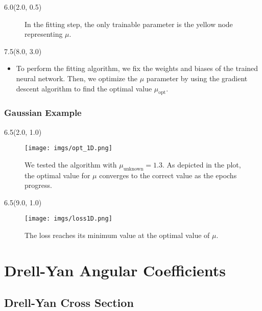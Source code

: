 \documentclass[12pt, xcolor={dvipsnames}, aspectratio = 169, sans,mathserif]{beamer}
\newenvironment{List}[2]
{\begin{textblock}{#1}#2
\begin{itemize}}
{\end{itemize}
\end{textblock}}
\newenvironment{Pic}[2]
{\begin{textblock}{#1}#2
\begin{figure}}
{\end{figure}
\end{textblock}}
\begin{document}
\begin{frame}
\begin{Pic}{6.0}{(2.0, 0.5)}
{
}
\caption{In the fitting step, the only trainable parameter is the yellow node representing $\mu$.}
\end{Pic}

\begin{List}{7.5}{(8.0, 3.0)}

  \item To perform the fitting algorithm, we fix the weights and biases of the trained neural network.
  Then, we optimize the $\mu$ parameter by using the gradient descent algorithm to find the optimal value $\mu_{\text{opt}}$.

\end{List}

\end{frame}

\begin{frame}
\frametitle{Gaussian Example}

\begin{Pic}{6.5}{(2.0, 1.0)}
\texttt{[image: imgs/opt\_1D.png]}
\caption{We tested the algorithm with $\mu_{\text{unknown}} = 1.3$. As depicted in the plot, the optimal value for $\mu$
converges to the correct value as the epochs progress.}
\end{Pic}

\begin{Pic}{6.5}{(9.0, 1.0)}
\texttt{[image: imgs/loss1D.png]}
\caption{The loss reaches its minimum value at the optimal value of $\mu$.}
\end{Pic}

\end{frame}

\section{Drell-Yan Angular Coefficients}
\subsection{Drell-Yan Cross Section}
\end{document}
